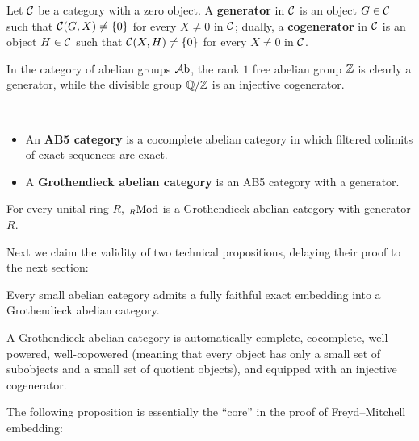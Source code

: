\documentclass[twoside]{article}
\begin{document}
\begin{defn}
Let ${\mathcal{C}}$ be a category with a zero object. A \textbf{generator} in ${\mathcal{C}}$ is an object $G \in {\mathcal{C}}$ such that ${\mathcal{C}}(G, X) \neq \{0\}$ for every $X \neq 0$ in ${\mathcal{C}}$; dually, a \textbf{cogenerator} in ${\mathcal{C}}$ is an object $H \in {\mathcal{C}}$ such that ${\mathcal{C}}(X, H)\neq \{0\}$ for every $X \neq 0$ in ${\mathcal{C}}$.
\end{defn}

\begin{expl}
In the category of abelian groups $\mathcal{A}\mathrm{b}$, the rank $1$ free abelian group $\mathbb{Z}$ is clearly a generator, while the divisible group $\mathbb{Q}/\mathbb{Z}$ is an injective cogenerator.
\end{expl}

\begin{defn}
\ 
\begin{itemize}
\item An \textbf{AB5 category} is a cocomplete abelian category in which filtered colimits of exact sequences are exact.
\item A \textbf{Grothendieck abelian category} is an AB5 category with a generator.
\end{itemize}
\end{defn}

\begin{expl}
For every unital ring $R$, ${}_R\mathrm{Mod}$ is a Grothendieck abelian category with generator $R$.
\end{expl}

Next we claim the validity of two technical propositions, delaying their proof to the next section:

\begin{prop}\label{preone}
Every small abelian category admits a fully faithful exact embedding into a Grothendieck abelian category.
\end{prop}

\begin{prop}\label{pretwo}
A Grothendieck abelian category is automatically complete, cocomplete, well-powered, well-copowered (meaning that every object has only a small set of subobjects and a small set of quotient objects), and equipped with an injective cogenerator.
\end{prop}

The following proposition is essentially the ``core'' in the proof of Freyd--Mitchell embedding:
\end{document}
